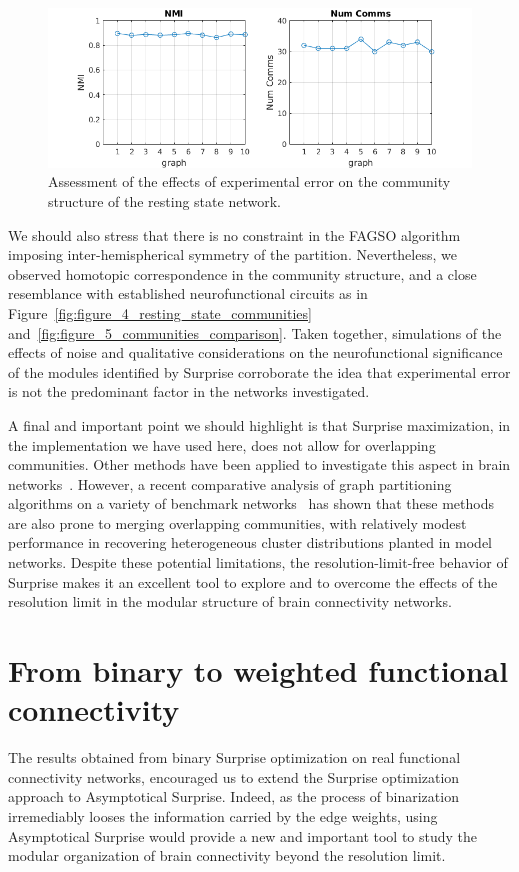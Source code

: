 \begin{figure}[ht]
\centering
\includegraphics[width=1\linewidth]{images/figure_9_nmi.png}
\caption{Assessment of the effects of experimental error on the community structure of the resting state network.}
\label{fig:figure_9_nmi}
\end{figure}

We should also stress that there is no constraint in the FAGSO algorithm imposing inter-hemispherical symmetry of the partition.
Nevertheless, we observed homotopic correspondence in the community structure, and a close resemblance with established neurofunctional circuits as in Figure~\ref{fig:figure_4_resting_state_communities} and~\ref{fig:figure_5_communities_comparison}. Taken together, simulations of the effects of noise and qualitative considerations on the neurofunctional significance of the modules identified by Surprise corroborate the idea that experimental error is not the predominant factor in the networks investigated.

A final and important point we should highlight is that Surprise maximization, in the implementation we have used here, does not allow for overlapping communities. Other methods have been applied to investigate this aspect in brain networks~\cite{palla2005,ahn2010}. However, a recent comparative analysis of graph partitioning algorithms on a variety of benchmark networks~\cite{lancichinetti2009} has shown that these methods are also prone to merging overlapping communities, with relatively modest performance in recovering heterogeneous cluster distributions planted in model networks.
Despite these potential limitations, the resolution-limit-free behavior of Surprise makes it an excellent tool to explore and to overcome the effects of the resolution limit in the modular structure of brain connectivity networks.

\section{From binary to weighted functional connectivity}
The results obtained from binary Surprise optimization on real functional connectivity networks, encouraged us to extend the Surprise optimization approach to Asymptotical Surprise. Indeed, as the process of binarization irremediably looses the information carried by the edge weights, using Asymptotical Surprise would provide a new and important tool to study the modular organization of brain connectivity beyond the resolution limit.
 
